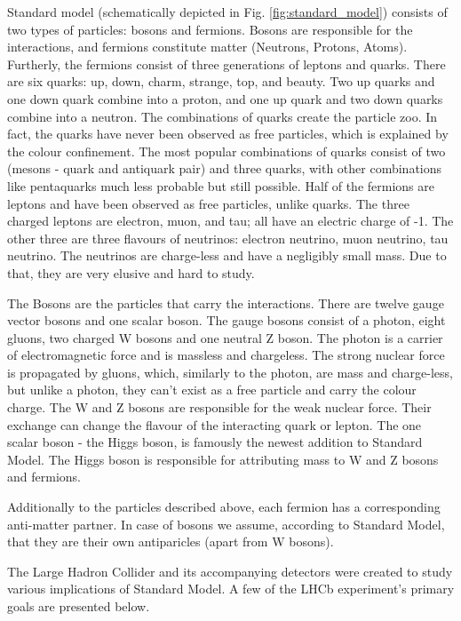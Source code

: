 Standard model (schematically depicted in Fig. \ref{fig:standard_model}) consists of two types of particles: bosons and fermions. Bosons are responsible for the interactions, and fermions constitute matter (Neutrons, Protons, Atoms).
Furtherly, the fermions consist of three generations of leptons and quarks.
There are six quarks: up, down, charm, strange, top, and beauty. Two up quarks and one down quark combine into a proton, and one up quark and two down quarks combine into a neutron.
The combinations of quarks create the particle zoo. In fact, the quarks have never been observed as free particles, which is explained by the colour confinement.
The most popular combinations of quarks consist of two (mesons - quark and antiquark pair) and three quarks, with other combinations like pentaquarks much less probable but still possible.
Half of the fermions are leptons and have been observed as free particles, unlike quarks. The three charged leptons are electron, muon, and tau; all have an electric charge of -1.
The other three are three flavours of neutrinos: electron neutrino, muon neutrino, tau neutrino.
The neutrinos are charge-less and have a negligibly small mass. Due to that, they are very elusive and hard to study.

The Bosons are the particles that carry the interactions. There are twelve gauge vector bosons and one scalar boson.
The gauge bosons consist of a photon, eight gluons, two charged W bosons and one neutral Z boson.
The photon is a carrier of electromagnetic force and is massless and chargeless.
The strong nuclear force is propagated by gluons, which, similarly to the photon, are mass and charge-less, but unlike a photon, they can't exist as a free particle and carry the colour charge.
The W and Z bosons are responsible for the weak nuclear force.
Their exchange can change the flavour of the interacting quark or lepton.
The one scalar boson - the Higgs boson, is famously the newest addition to Standard Model.
The Higgs boson is responsible for attributing mass to W and Z bosons and fermions.

Additionally to the particles described above, each fermion has a corresponding anti-matter partner. In case of bosons we assume, according to Standard Model, that they are their own antiparicles (apart from W bosons).

The Large Hadron Collider and its accompanying detectors were created to study various implications of Standard Model. A few of the LHCb experiment's primary goals are presented below.


